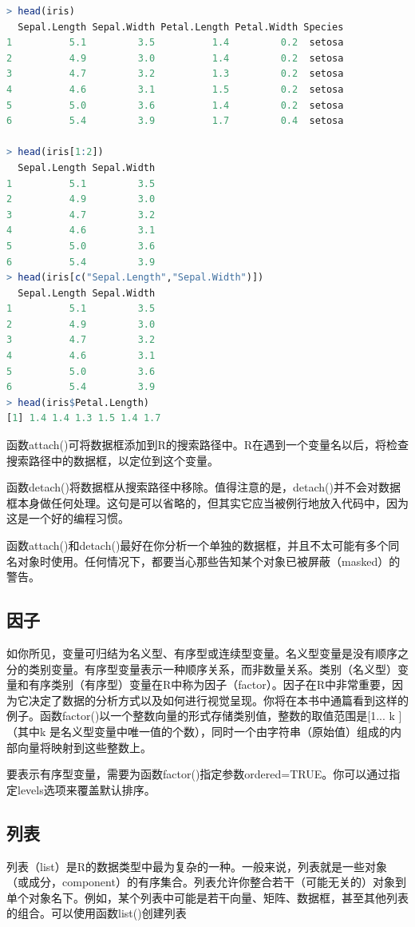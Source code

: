 \documentclass[11pt,a4paper,oneside]{book}
\begin{document}
\begin{lstlisting}[language=R]
> head(iris)
  Sepal.Length Sepal.Width Petal.Length Petal.Width Species
1          5.1         3.5          1.4         0.2  setosa
2          4.9         3.0          1.4         0.2  setosa
3          4.7         3.2          1.3         0.2  setosa
4          4.6         3.1          1.5         0.2  setosa
5          5.0         3.6          1.4         0.2  setosa
6          5.4         3.9          1.7         0.4  setosa

> head(iris[1:2])
  Sepal.Length Sepal.Width
1          5.1         3.5
2          4.9         3.0
3          4.7         3.2
4          4.6         3.1
5          5.0         3.6
6          5.4         3.9
> head(iris[c("Sepal.Length","Sepal.Width")])
  Sepal.Length Sepal.Width
1          5.1         3.5
2          4.9         3.0
3          4.7         3.2
4          4.6         3.1
5          5.0         3.6
6          5.4         3.9
> head(iris$Petal.Length)
[1] 1.4 1.4 1.3 1.5 1.4 1.7
\end{lstlisting}

函数attach()可将数据框添加到R的搜索路径中。R在遇到一个变量名以后，将检查搜索路径中的数据框，以定位到这个变量。

函数detach()将数据框从搜索路径中移除。值得注意的是，detach()并不会对数据框本身做任何处理。这句是可以省略的，但其实它应当被例行地放入代码中，因为这是一个好的编程习惯。

函数attach()和detach()最好在你分析一个单独的数据框，并且不太可能有多个同名对象时使用。任何情况下，都要当心那些告知某个对象已被屏蔽（masked）的警告。

\subsection{因子}
如你所见，变量可归结为名义型、有序型或连续型变量。名义型变量是没有顺序之分的类别变量。有序型变量表示一种顺序关系，而非数量关系。类别（名义型）变量和有序类别（有序型）变量在R中称为因子（factor）。因子在R中非常重要，因为它决定了数据的分析方式以及如何进行视觉呈现。你将在本书中通篇看到这样的例子。函数factor()以一个整数向量的形式存储类别值，整数的取值范围是[1... k ]（其中k 是名义型变量中唯一值的个数），同时一个由字符串（原始值）组成的内部向量将映射到这些整数上。

要表示有序型变量，需要为函数factor()指定参数ordered=TRUE。你可以通过指定levels选项来覆盖默认排序。

\subsection{列表}
列表（list）是R的数据类型中最为复杂的一种。一般来说，列表就是一些对象（或成分，component）的有序集合。列表允许你整合若干（可能无关的）对象到单个对象名下。例如，某个列表中可能是若干向量、矩阵、数据框，甚至其他列表的组合。可以使用函数list()创建列表
\end{document}
